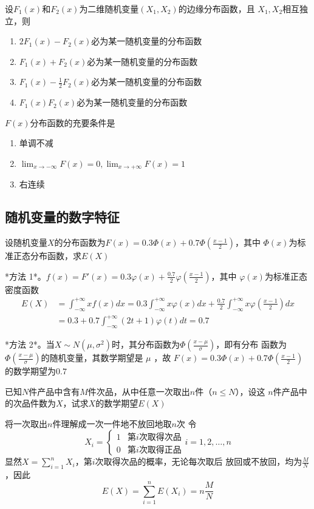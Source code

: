 \documentclass{article}
\begin{document}
\begin{examplle}[]
设\(F_1(x)\)和\(F_2(x)\)为二维随机变量\((X_1,X_2)\)的边缘分布函数，且
\(X_1,X_2\)相互独立，则
\begin{enumerate}
\item \(2F_1(x)-F_2(x)\)必为某一随机变量的分布函数
\item \(F_1(x)+F_2(x)\)必为某一随机变量的分布函数
\item \(F_1(x)-\frac{1}{2}F_2(x)\)必为某一随机变量的分布函数
\item \(F_1(x)F_2(x)\)必为某一随机变量的分布函数
\end{enumerate}


\(F(x)\)分布函数的充要条件是
\begin{enumerate}
\item 单调不减
\item \(\displaystyle\lim_{x\to-\infty}F(x)=0,\lim_{x\to+\infty}F(x)=1\)
\item 右连续
\end{enumerate}
\end{examplle}
\subsection{随机变量的数字特征}
\label{sec:orgf4aa210}
\begin{examplle}[]
设随机变量\(X\)的分布函数为\(F(x)=0.3\Phi(x)+0.7\Phi(\frac{x-1}{2})\)，其中
\(\Phi(x)\)为标准正态分布函数，求\(E(X)\)

*方法 1*。\(f(x)=F'(x)=0.3\varphi(x)+\frac{0.7}{2}\varphi(\frac{x-1}{2})\)，其中
 \(\varphi(x)\)为标准正态密度函数
\begin{align*}
E(X)&=\int_{-\infty}^{+\infty}xf(x)dx=0.3\int_{-\infty}^{+\infty}x\varphi(x)dx+
\frac{0.7}{2}\int_{-\infty}^{+\infty}x\varphi(\frac{x-1}{2})dx\\
&=0.3+0.7\int_{-\infty}^{+\infty}(2t+1)\varphi(t)dt=0.7
\end{align*}

*方法 2*。当\(X\sim N(\mu,\sigma^2)\)时，其分布函数为\(\Phi(\frac{x-\mu}{\sigma})\)，即有分布
 函数为\(\Phi(\frac{x-\mu}{\sigma})\)的随机变量，其数学期望是 \(\mu\) ，故
 \(F(x)=0.3\Phi(x)+0.7\Phi(\frac{x-1}{2})\)的数学期望为\(0.7\)
\end{examplle}

\begin{examplle}[]
已知\(N\)件产品中含有\(M\)件次品，从中任意一次取出\(n\)件（\(n\le N\)），设这
\(n\)件产品中的次品件数为\(X\)，试求\(X\)的数学期望\(E(X)\)

将一次取出\(n\)件理解成一次一件地不放回地取\(n\)次
令
\begin{equation*}
X_i=
\begin{cases}
1&\text{第$i$次取得次品}\\
0&\text{第$i$次取得正品}
\end{cases}
i=1,2,\dots,n
\end{equation*}
显然\(X=\displaystyle\sum_{i=1}^nX_i\)，第\(i\)次取得次品的概率，无论每次取后
放回或不放回，均为\(\frac{M}{N}\)，因此
\begin{equation*}
E(X)=\sum_{i=1}^nE(X_i)=n\frac{M}{N}
\end{equation*}
\end{examplle}
\end{document}
